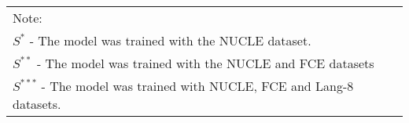\documentclass{standalone}
\begin{document}
\begin{landscape}
\begin{table}[t]
\begin{tabular}{p{6cm} p{13cm}  }
\multicolumn{2}{l}{Note: }\\
\multicolumn{2}{l}{{\(S^*\) - The model was trained with the NUCLE dataset.}}\\
\multicolumn{2}{l}{{\(S^{**}\) - The model was trained with the NUCLE and FCE datasets }}\\
\multicolumn{2}{l}{{\(S^{***}\) - The model was trained with NUCLE, FCE
and Lang-8 datasets.}}
\end{tabular}
\end{table}
\end{landscape}
\end{document}
